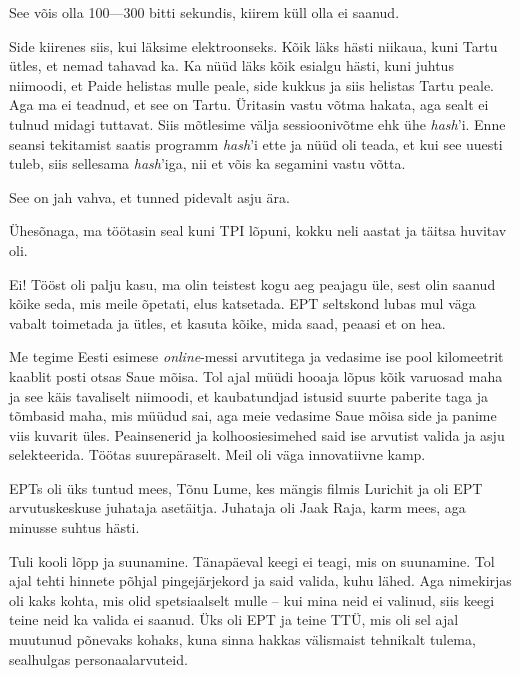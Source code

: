 
See võis olla 100---300 bitti sekundis, kiirem küll olla ei saanud. 

Side kiirenes siis, kui läksime elektroonseks. Kõik läks hästi niikaua, 
kuni Tartu ütles, et nemad tahavad ka. Ka nüüd läks kõik esialgu 
hästi, kuni juhtus niimoodi, et Paide helistas mulle peale, side kukkus ja 
siis helistas Tartu peale. Aga ma ei teadnud, et see on Tartu. Üritasin vastu 
võtma hakata, aga sealt ei tulnud midagi tuttavat. Siis mõtlesime välja sessioonivõtme ehk ühe \emph{hash}'i. Enne seansi
tekitamist saatis programm \emph{hash}'i ette ja nüüd oli teada, et 
kui see uuesti tuleb, siis sellesama \emph{hash}'iga, nii et võis ka segamini 
vastu võtta. 


See on jah vahva, et tunned pidevalt asju ära. 

Ühesõnaga, ma töötasin seal kuni TPI lõpuni, kokku neli aastat ja täitsa huvitav oli.


Ei! Tööst oli palju kasu, ma olin teistest kogu aeg peajagu üle, sest olin 
saanud kõike seda, mis meile õpetati, elus katsetada. EPT seltskond lubas 
mul väga vabalt toimetada ja ütles, et kasuta kõike, mida saad, peaasi 
et on hea. 

Me tegime Eesti esimese \emph{online}-messi 
arvutitega ja vedasime ise pool kilomeetrit kaablit posti otsas Saue mõisa. Tol 
ajal müüdi hooaja lõpus kõik varuosad maha ja see käis tavaliselt 
niimoodi, et kaubatundjad istusid suurte paberite taga ja tõmbasid maha, mis 
müüdud sai, aga meie vedasime Saue mõisa side ja panime viis kuvarit üles. Peainsenerid ja kolhoosiesimehed said ise 
arvutist valida ja asju selekteerida. Töötas suurepäraselt. Meil oli väga innovatiivne 
kamp.

EPTs oli üks tuntud mees, Tõnu Lume, kes mängis filmis 
Lurichit ja 
oli EPT arvutuskeskuse juhataja asetäitja. Juhataja oli Jaak Raja, karm mees, aga minusse suhtus hästi. 


Tuli kooli lõpp ja suunamine. Tänapäeval keegi ei teagi, mis on suunamine. 
Tol ajal tehti hinnete põhjal pingejärjekord ja said valida, kuhu lähed. Aga nimekirjas oli kaks kohta, mis 
olid spetsiaalselt mulle -- kui mina neid ei valinud, siis keegi teine neid 
ka valida ei saanud. Üks oli EPT ja teine TTÜ, mis oli sel 
ajal muutunud põnevaks kohaks, kuna sinna hakkas välismaist
tehnikalt tulema, sealhulgas personaalarvuteid. 

